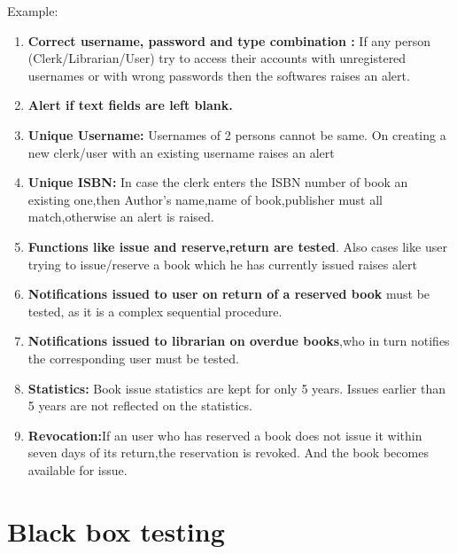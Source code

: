 \documentclass{article}
\begin{document}
Example: \\
\begin{enumerate}
\item \textbf{Correct username, password and type combination :} If any person (Clerk/Librarian/User) try to access their accounts with unregistered usernames or with wrong passwords then the softwares raises an alert.
\item \textbf{Alert if text fields are left blank.}
\item \textbf{Unique Username:} Usernames of 2 persons cannot be same. On creating a new clerk/user with an existing username raises an alert
\item \textbf{Unique ISBN:} In case the clerk enters the ISBN number of book an existing one,then Author's name,name of book,publisher must all match,otherwise an alert is raised.
\item \textbf{Functions like issue and reserve,return are tested}. Also cases like user trying to issue/reserve a book which he has currently issued raises alert 
\item \textbf{Notifications issued to user on return of a reserved book} must be tested, as it is a complex sequential procedure.
\item \textbf{Notifications issued to librarian on overdue books},who in turn notifies the corresponding user must be tested.
\item \textbf{Statistics:}  Book issue statistics are kept for only 5 years. Issues earlier than 5 years are not reflected on the statistics.
\item \textbf{Revocation:}If an user who has reserved a book does not issue it within seven days of its return,the reservation is revoked.  And the book becomes available for issue.
\end{enumerate}

\section{Black box testing}
\end{document}
